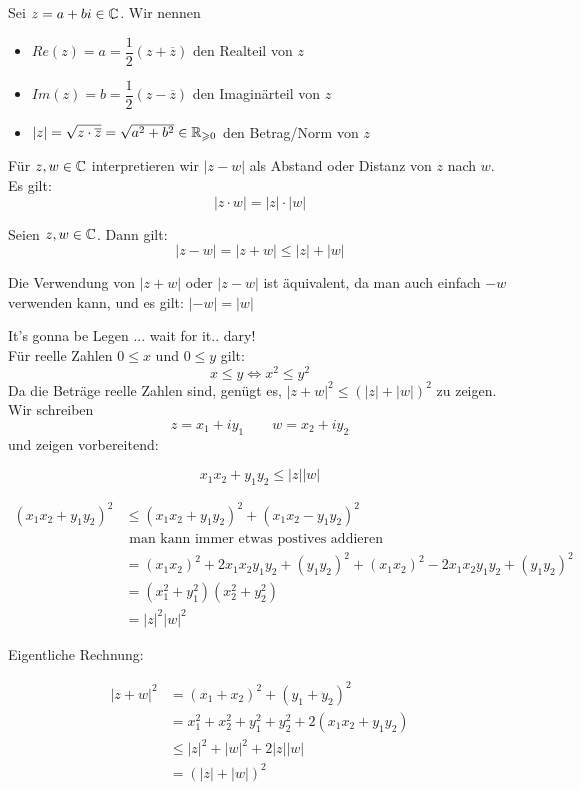 \documentclass[main.tex]{subfiles}
\begin{document}
\begin{Definition}
  Sei $z =a+bi \in \mathbb{C}$. Wir nennen
  \begin{itemize}
    \item $Re(z) = a = \dfrac{1}{2}(z+\overline{z})$ den Realteil von $z$
    \item $Im(z) = b = \dfrac{1}{2}(z-\overline{z})$ den Imaginärteil von $z$
    \item $|z| = \sqrt{z\cdot \overline{z}} = \sqrt{a^2 + b^2} \in \mathbb{R}_{\geqslant 0}$ den Betrag/Norm von $z$
  \end{itemize}
\end{Definition}

\begin{Definition}[Abstand]
  Für $z,w \in \mathbb{C}$ interpretieren wir $|z-w|$ als Abstand oder Distanz von $z$ nach $w$. Es gilt:
  $$|z\cdot w| = |z|\cdot |w|$$
\end{Definition}

\begin{Theorem}[Dreiecksungleichung ($\C$)]
  Seien $z,w \in \mathbb{C}$. Dann gilt:
  $$|z-w| = |z+w| \leq |z|+|w|$$
\end{Theorem}

\begin{Bemerkung}
  Die Verwendung von $|z+w|$ oder $|z-w|$ ist äquivalent, da man auch einfach $-w$ verwenden kann, und es gilt: $|-w| = |w|$
\end{Bemerkung}

\begin{Beweis}
  It's gonna be Legen ... wait for it.. dary!\\
  Für reelle Zahlen $0 \leq x$ und $0 \leq y$ gilt:
  $$x \leq y \Leftrightarrow x^2 \leq y^2$$
  Da die Beträge reelle Zahlen sind, genügt es, $|z+w|^2 \leq (|z|+|w|)^2$ zu zeigen.\\
  Wir schreiben $$z = x_1 + i y_1 \qquad w = x_2 + iy_2$$
  und zeigen vorbereitend:
  \begin{Theorem}
    $$x_1x_2 + y_1 y_2 \leq |z||w|$$
  \end{Theorem}
  \begin{Beweis}
    $$\begin{aligned}
      (x_1 x_2 + y_1 y_2)^2 & \leq (x_1 x_2 + y_1 y_2)^2 + (x_1 x_2 - y_1 y_2)^2 \\
      & \text{ man kann immer etwas postives addieren} \\
      & = (x_1x_2)^2 + 2 x_1 x_2 y_1 y_2 + (y_1y_2)^2 + (x_1 x_2)^2 - 2 x_1 x_2 y_1 y_2 + (y_1 y_2)^2 \\
      & = (x_1^2 + y_1^2)(x_2^2 + y_2^2) \\
      & = |z|^2 |w|^2
    \end{aligned}$$
  \end{Beweis}
  Eigentliche Rechnung:

  $$\begin{aligned}
    |z+w|^2 &= (x_1 + x_2)^2 + (y_1 +y_2)^2\\
    &= x_1^2 + x_2^2 + y_1^2 + y_2^2 + 2(x_1x_2 + y_1 y_2)\\
    &\leq |z|^2 + |w|^2 + 2 |z||w|\\
    &= (|z|+|w|)^2
  \end{aligned}$$
\end{Beweis}
\end{document}
